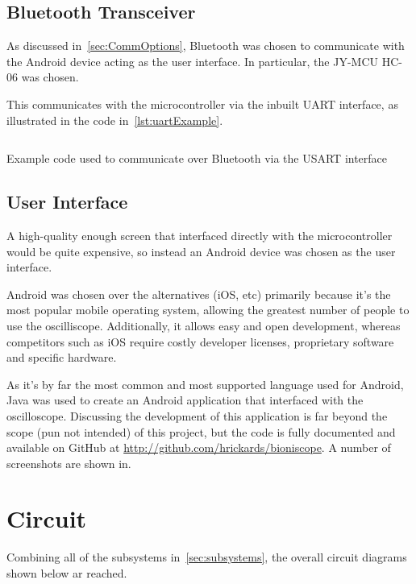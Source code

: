 \subsection{Bluetooth Transceiver}
\label{sec:wireless_transceiver}

As discussed in~\cref{sec:CommOptions}, Bluetooth was chosen to communicate with
the Android device acting as the user interface. In particular, the JY-MCU HC-06
was chosen.

This communicates with the microcontroller via the inbuilt UART interface, as
illustrated in the code in~\cref{lst:uartExample}.

\begin{listing}[H]
  \inputminted{c}{code/USART.c}
  \caption{Example code used to communicate over Bluetooth via the USART
  interface}
  \label{lst:uartExample}
\end{listing}

\subsection{User Interface}
\label{sec:user_interface}

A high-quality enough screen that interfaced directly with the microcontroller
would be quite expensive, so instead an Android device was chosen as the user
interface.

Android was chosen over the alternatives (iOS, etc) primarily because it's the
most popular mobile operating system, allowing the greatest number of people to
use the oscilliscope. Additionally, it allows easy and open development, whereas
competitors such as iOS require costly developer licenses, proprietary software
and specific hardware.

As it's by far the most common and most supported language used for Android,
Java was used to create an Android application that interfaced with the
oscilloscope. Discussing the development of this application is far beyond the
scope (pun not intended) of this project, but the code is fully documented and
available on GitHub at \url{http://github.com/hrickards/bioniscope}. A number of
screenshots are shown in.




\section{Circuit}
Combining all of the subsystems in~\cref{sec:subsystems}, the overall circuit
diagrams shown below ar reached.

